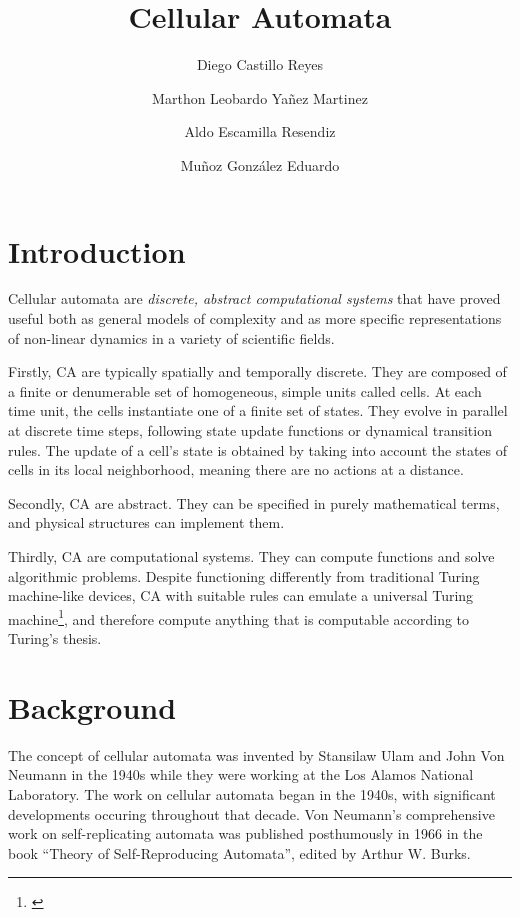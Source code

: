 \documentclass[9pt,a4paper,twoside]{tau-class/tau}
\title{Cellular Automata}
\author[a]{Diego Castillo Reyes}
\author[a]{Marthon Leobardo Yañez Martinez}
\author[a]{Aldo Escamilla Resendiz}
\author[a]{Muñoz González Eduardo}
\affil[a]{Researcher}
\begin{document}
	
    \maketitle 
    \thispagestyle{firststyle} \tauabstract
    \tableofcontents

\section{Introduction}

    Cellular automata  are \textit{discrete, abstract computational systems} that have proved useful both as general models of complexity and as more specific representations of non-linear dynamics in a variety of scientific fields. 

    Firstly, CA are typically spatially and temporally discrete. They are composed of a finite or denumerable set of homogeneous, simple units called cells. At each time unit, the cells instantiate one of a finite set of states. 
    They evolve in parallel at discrete time steps, following state update functions or dynamical transition rules. 
    The update of a cell's state is obtained by taking into account the states of cells in its local neighborhood, meaning there are no actions at a distance.

    Secondly, CA are abstract. They can be specified in purely mathematical terms, and physical structures can implement them.

    Thirdly, CA are computational systems. They can compute functions and solve algorithmic problems. Despite functioning differently from traditional 
    Turing machine-like devices, CA with suitable rules can emulate a universal Turing machine\footnote{\cite[The Stanford Encyclopedia of Philosophy (Winter 2021 Edition), Edward N. Zalta (ed.)]{sep-touring-machine}}, 
    and therefore compute anything that is computable according to Turing's thesis.\cite{sep-cellular-automata}


\section{Background}


    The concept of cellular automata was invented by Stansilaw Ulam and John Von Neumann in
    the 1940s while they were working at the Los Alamos National Laboratory.
    The work on cellular automata began in the 1940s, with significant developments occuring throughout
    that decade. Von Neumann’s comprehensive work on self-replicating automata was published 
    posthumously in 1966 in the book ``Theory of Self-Reproducing Automata'', edited by 
    Arthur W. Burks.
\end{document}
